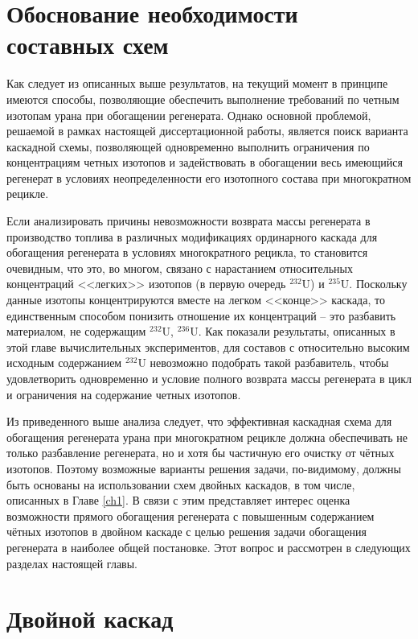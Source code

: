 \section{Обоснование необходимости составных схем}\label{sec:ch2/sec2}

Как следует из описанных выше результатов, на текущий момент в принципе имеются способы, позволяющие обеспечить выполнение требований по четным изотопам урана при обогащении регенерата. Однако основной проблемой, решаемой в рамках настоящей диссертационной работы, является поиск варианта каскадной схемы, позволяющей одновременно выполнить ограничения по концентрациям четных изотопов и задействовать в обогащении весь имеющийся регенерат в условиях неопределенности его изотопного состава при многократном рецикле.

Если анализировать причины невозможности возврата массы регенерата в производство топлива в различных модификациях ординарного каскада для обогащения регенерата в условиях многократного рецикла, то становится очевидным, что это, во многом, связано с нарастанием относительных концентраций <<легких>> изотопов (в первую очередь $^{232}$U) и $^{235}$U. Поскольку данные изотопы концентрируются вместе на легком <<конце>> каскада, то единственным способом понизить отношение их концентраций -- это разбавить материалом, не содержащим $^{232}$U, $^{236}$U. Как показали результаты, описанных в этой главе вычислительных экспериментов, для составов с относительно высоким исходным содержанием $^{232}$U невозможно подобрать такой разбавитель, чтобы удовлетворить одновременно и условие полного возврата массы регенерата в цикл и ограничения на содержание четных изотопов.

Из приведенного выше анализа следует, что эффективная каскадная схема для обогащения регенерата урана при многократном рецикле должна обеспечивать не только разбавление регенерата, но и хотя бы частичную его очистку от чётных изотопов. Поэтому возможные варианты решения задачи, по-видимому, должны быть основаны на использовании схем двойных каскадов, в том числе, описанных в Главе \ref{ch1}. В связи с этим представляет интерес оценка возможности прямого обогащения регенерата с повышенным содержанием чётных изотопов в двойном каскаде с целью решения задачи обогащения регенерата в наиболее общей постановке. Этот вопрос и рассмотрен в следующих разделах настоящей главы.



\section{Двойной каскад}\label{sec:ch2/dvoynoy}

